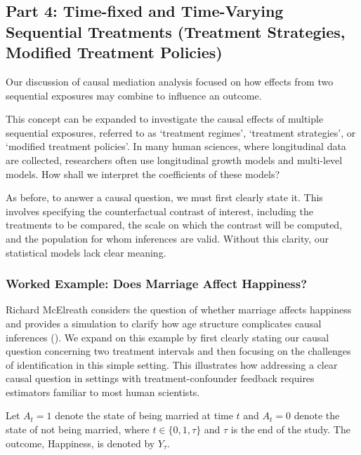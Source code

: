 \documentclass[
  single column]{article}
\begin{document}
\subsection{Part 4: Time-fixed and Time-Varying Sequential Treatments
(Treatment Strategies, Modified Treatment
Policies)}\label{part-4-time-fixed-and-time-varying-sequential-treatments-treatment-strategies-modified-treatment-policies}

Our discussion of causal mediation analysis focused on how effects from
two sequential exposures may combine to influence an outcome.

This concept can be expanded to investigate the causal effects of
multiple sequential exposures, referred to as `treatment regimes',
`treatment strategies', or `modified treatment policies'. In many human
sciences, where longitudinal data are collected, researchers often use
longitudinal growth models and multi-level models. How shall we
interpret the coefficients of these models?

As before, to answer a causal question, we must first clearly state it.
This involves specifying the counterfactual contrast of interest,
including the treatments to be compared, the scale on which the contrast
will be computed, and the population for whom inferences are valid.
Without this clarity, our statistical models lack clear meaning.

\subsubsection{Worked Example: Does Marriage Affect
Happiness?}\label{worked-example-does-marriage-affect-happiness}

Richard McElreath considers the question of whether marriage affects
happiness and provides a simulation to clarify how age structure
complicates causal inferences (). We expand on this example by first clearly stating
our causal question concerning two treatment intervals and then focusing
on the challenges of identification in this simple setting. This
illustrates how addressing a clear causal question in settings with
treatment-confounder feedback requires estimators familiar to most human
scientists.

Let \(A_t = 1\) denote the state of being married at time \(t\) and
\(A_t = 0\) denote the state of not being married, where
\(t \in \{0, 1, \tau\}\) and \(\tau\) is the end of the study. The
outcome, Happiness, is denoted by \(Y_\tau\).
\end{document}
